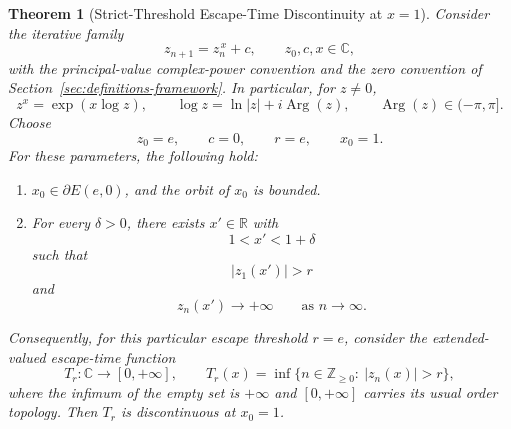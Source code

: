\documentclass[12pt,a4paper]{amsart}
\newtheorem{theorem}{Theorem}[section]
\theoremstyle{remark}
\newcommand{\C}{\mathbb{C}}
\newcommand{\R}{\mathbb{R}}
\newcommand{\Z}{\mathbb{Z}}
\begin{document}
\begin{theorem}[Strict-Threshold Escape-Time Discontinuity at $x=1$]
\label{thm:boundary-escape-time-instability}
Consider the iterative family
\[
z_{n+1}=z_n^{\,x}+c,\qquad z_0,c,x\in\C,
\]
with the principal-value complex-power convention and the zero convention of
Section~\ref{sec:definitions-framework}. In particular, for $z\ne0$,
\[
z^x=\exp(x\log z),\qquad
\log z=\ln|z|+i\operatorname{Arg}(z),\qquad \operatorname{Arg}(z)\in(-\pi,\pi].
\]
Choose
\[
z_0=e,\qquad c=0,\qquad r=e,\qquad x_0=1.
\]
For these parameters, the following hold:
\begin{enumerate}
    \item $x_0\in\partial E(e,0)$, and the orbit of $x_0$ is bounded.
    \item For every $\delta>0$, there exists $x'\in\R$ with
    \[
    1<x'<1+\delta
    \]
    such that
    \[
    |z_1(x')|>r
    \]
    and
    \[
    z_n(x')\longrightarrow+\infty
    \qquad\text{as }n\to\infty.
    \]
\end{enumerate}
Consequently, for this particular escape threshold $r=e$, consider the
extended-valued escape-time function
\[
T_r:\C\longrightarrow[0,+\infty],
\qquad
T_r(x)=\inf\{n\in\Z_{\ge0}:\ |z_n(x)|>r\},
\]
where the infimum of the empty set is $+\infty$ and $[0,+\infty]$ carries
its usual order topology. Then $T_r$ is discontinuous at $x_0=1$.

\end{theorem}
\end{document}
